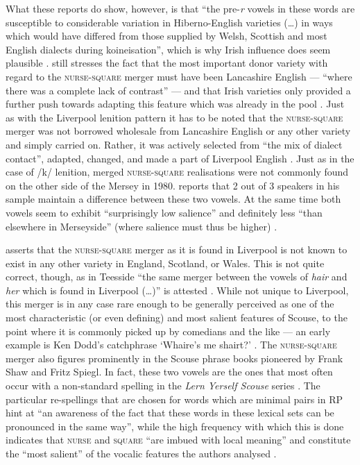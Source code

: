 What these reports do show, however, is that ``the pre-\emph{r} vowels in these words are susceptible to considerable variation in Hiberno-English varieties (\ldots) in ways which would have differed from those supplied by Welsh, Scottish and most English dialects during koineisation'', which is why Irish influence does seem plausible \citep[128]{honeybone2007}.
\citeauthor{honeybone2007} still stresses the fact that the most important donor variety with regard to the \textsc{nurse}-\textsc{square} merger must have been Lancashire English --- ``where there was a complete lack of contrast'' --- and that Irish varieties only provided a further push towards adapting this feature which was already in the pool \citep[129]{honeybone2007}.
Just as with the Liverpool lenition pattern it has to be noted that the \textsc{nurse}-\textsc{square} merger was not borrowed wholesale from Lancashire English or any other variety and simply carried on. 
Rather, it was actively selected from ``the mix of dialect contact'', adapted, changed, and made a part of Liverpool English \citeyearpar[cf.][129]{honeybone2007}.
Just as in the case of /k/ lenition, merged \textsc{nurse}-\textsc{square} realisations were not commonly found on the other side of the Mersey in 1980.
\textcite[95]{newbrook1999} reports that 2 out of 3 speakers in his sample maintain a difference between these two vowels.
At the same time both vowels seem to exhibit ``surprisingly low salience'' and definitely less ``than elsewhere in Merseyside'' (where salience must thus be higher) \parencite[95]{newbrook1999}.

\citet[cf.][128]{honeybone2007} asserts that the \textsc{nurse}-\textsc{square} merger as it is found in Liverpool is not known to exist in any other variety in England, Scotland, or Wales.
This is not quite correct, though, as in Teesside ``the same merger between the vowels of \emph{hair} and \emph{her} which is found in Liverpool (\dots)'' is attested \parencite[70]{trudgill1999}.
While not unique to Liverpool, this merger is in any case rare enough to be generally perceived as one of the most characteristic (or even defining) and most salient features of Scouse, to the point where it is commonly picked up by comedians and the like --- an early example is Ken Dodd's catchphrase `Whaire's me shairt?' \citep[cf.][73]{trudgill1999}.
The \textsc{nurse}-\textsc{square} merger also figures prominently in the Scouse phrase books pioneered by Frank Shaw and Fritz Spiegl.
In fact, these two vowels are the ones that most often occur with a non-standard spelling in the \emph{Lern Yerself Scouse} series \parencite[cf.][322]{honeybonewatson2013}.
The particular re-spellings that are chosen for words which are minimal pairs in RP hint at ``an awareness of the fact that these words in these lexical sets can be pronounced in the same way'', while the high frequency with which this is done indicates that \textsc{nurse} and \textsc{square} ``are imbued with local meaning'' and constitute the ``most salient'' of the vocalic features the authors analysed \parencite[324]{honeybonewatson2013}.

